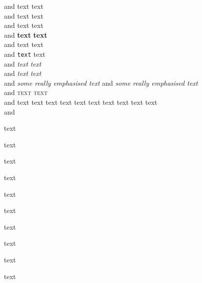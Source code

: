 \documentclass[fleqn,a4paper,11pt]{article}
\begin{document}
    and \textmd{text} {\mdseries text} %
  \\and \textrm{text} {\rmfamily text} %
  \\and \textup{text} {\upshape text}  %
  \\and \textbf{text} {\bfseries text} %
  \\and \textsf{text} {\sffamily text} %
  \\and \texttt{text} {\ttfamily text} %
  \\and \textit{text} {\itshape text}  %
  \\and \textsl{text} {\slshape text}  %
  \\and \emph{some \emph{really} emphasised text} %
    and {\em some {\em really} emphasised text} %
  \\and \textsc{text} {\scshape text}  %
  \\and {\tiny         text} %
        {\scriptsize   text} %
        {\footnotesize text} %
        {\small        text}
        {\normalsize   text} %
        {\large        text}
        {\Large        text}
        {\LARGE        text}
        {\huge         text}
        {\Huge         text}
  \\and \begin{tiny}        text\end{tiny}
        \begin{scriptsize}  text\end{scriptsize}
        \begin{footnotesize}text\end{footnotesize}
        \begin{small}       text\end{small}
        \begin{normalsize}  text\end{normalsize}
        \begin{large}       text\end{large}
        \begin{Large}       text\end{Large}
        \begin{LARGE}       text\end{LARGE}
        \begin{huge}        text\end{huge}
        \begin{Huge}        text\end{Huge}
\end{document}
